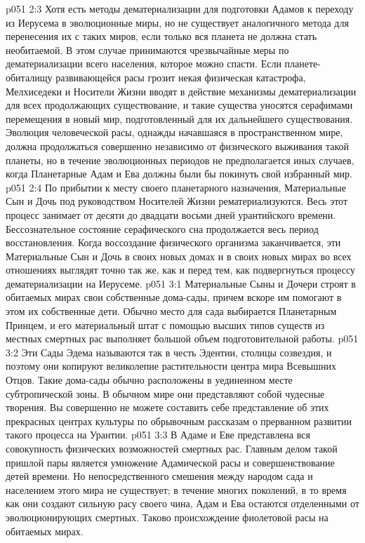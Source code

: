 \vs p051 2:3 \pc Хотя есть методы дематериализации для подготовки Адамов к переходу из Иерусема в эволюционные миры, но не существует аналогичного метода для перенесения их с таких миров, если только вся планета не должна стать необитаемой. В этом случае принимаются чрезвычайные меры по дематериализации всего населения, которое можно спасти. Если планете\hyp{}обиталищу развивающейся расы грозит некая физическая катастрофа, Мелхиседеки и Носители Жизни вводят в действие механизмы дематериализации для всех продолжающих существование, и такие существа уносятся серафимами перемещения в новый мир, подготовленный для их дальнейшего существования. Эволюция человеческой расы, однажды начавшаяся в пространственном мире, должна продолжаться совершенно независимо от физического выживания такой планеты, но в течение эволюционных периодов не предполагается иных случаев, когда Планетарные Адам и Ева должны были бы покинуть свой избранный мир.
\vs p051 2:4 \pc По прибытии к месту своего планетарного назначения, Материальные Сын и Дочь под руководством Носителей Жизни рематериализуются. Весь этот процесс занимает от десяти до двадцати восьми дней урантийского времени. Бессознательное состояние серафического сна продолжается весь период восстановления. Когда воссоздание физического организма заканчивается, эти Материальные Сын и Дочь в своих новых домах и в своих новых мирах во всех отношениях выглядят точно так же, как и перед тем, как подвергнуться процессу дематериализации на Иерусеме.
\vs p051 3:1 Материальные Сыны и Дочери строят в обитаемых мирах свои собственные дома\hyp{}сады, причем вскоре им помогают в этом их собственные дети. Обычно место для сада выбирается Планетарным Принцем, и его материальный штат с помощью высших типов существ из местных смертных рас выполняет большой объем подготовительной работы.
\vs p051 3:2 Эти Сады Эдема называются так в честь Эдентии, столицы созвездия, и поэтому они копируют великолепие растительности центра мира Всевышних Отцов. Такие дома\hyp{}сады обычно расположены в уединенном месте субтропической зоны. В обычном мире они представляют собой чудесные творения. Вы совершенно не можете составить себе представление об этих прекрасных центрах культуры по обрывочным рассказам о прерванном развитии такого процесса на Урантии.
\vs p051 3:3 \pc В Адаме и Еве представлена вся совокупность физических возможностей смертных рас. Главным делом такой пришлой пары является умножение Адамической расы и совершенствование детей времени. Но непосредственного смешения между народом сада и населением этого мира не существует; в течение многих поколений, в то время как они создают сильную расу своего чина, Адам и Ева остаются отделенными от эволюционирующих смертных. Таково происхождение фиолетовой расы на обитаемых мирах.
